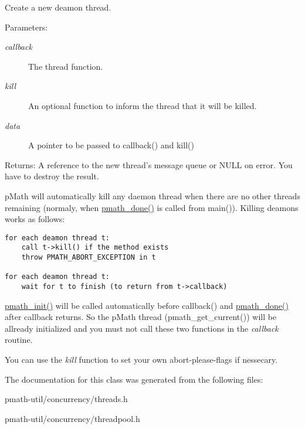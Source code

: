 Create a new deamon thread. 

\begin{Desc}
\item[Parameters:]
\begin{description}
\item[{\em callback}]The thread function. \item[{\em kill}]An optional function to inform the thread that it will be killed. \item[{\em data}]A pointer to be passed to callback() and kill() \end{description}
\end{Desc}
\begin{Desc}
\item[Returns:]A reference to the new thread's message queue or NULL on error. You have to destroy the result.\end{Desc}
pMath will automatically kill any daemon thread when there are no other threads remaining (normaly, when \hyperlink{group__frontend_g012705e1fd248a7cebf738bae6375dd9}{pmath\_\-done()} is called from main()). Killing deamons works as follows:



\begin{Code}\begin{verbatim}for each deamon thread t:
    call t->kill() if the method exists
    throw PMATH_ABORT_EXCEPTION in t
    
for each deamon thread t:
    wait for t to finish (to return from t->callback)
\end{verbatim}
\end{Code}



\hyperlink{group__frontend_gfb9f2c789bee5295c6794d16c0164943}{pmath\_\-init()} will be called automatically before callback() and \hyperlink{group__frontend_g012705e1fd248a7cebf738bae6375dd9}{pmath\_\-done()} after callback returns. So the pMath thread (pmath\_\-get\_\-current()) will be allready initialized and you must not call these two functions in the {\em callback\/} routine.

You can use the {\em kill\/} function to set your own abort-please-flags if nessecary. 

The documentation for this class was generated from the following files:\begin{CompactItemize}
\item 
pmath-util/concurrency/threads.h\item 
pmath-util/concurrency/threadpool.h\end{CompactItemize}
